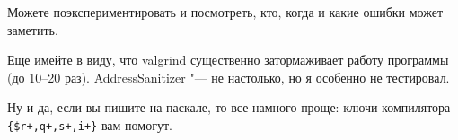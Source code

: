 \documentclass[a4paper,10pt]{problems}
\begin{document}
Можете поэкспериментировать и посмотреть, кто, когда и какие ошибки может заметить.

Еще имейте в виду, что valgrind существенно затормаживает работу программы (до 10--20 раз). 
AddressSanitizer "--- не настолько, но я особенно не тестировал.

Ну и да, если вы пишите на паскале, то все намного проще: ключи компилятора \verb`{$r+,q+,s+,i+}` вам помогут.

\end{document}
